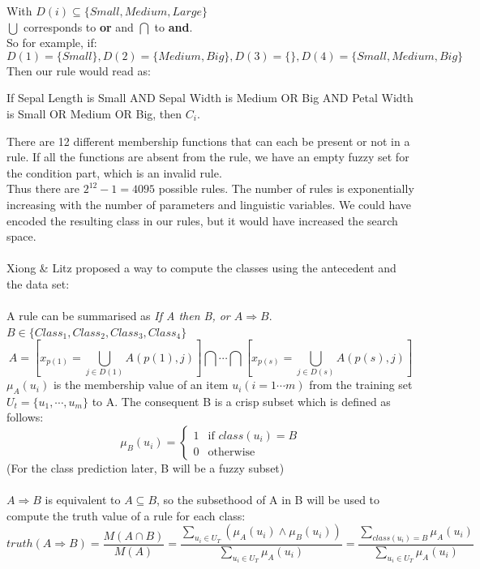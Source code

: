\documentclass[a4paper,12pt]{article}
\begin{document}
With $D(i)\subseteq\{Small,Medium,Large\}$ \\
$\bigcup$ corresponds to \textbf{or} and $\bigcap$ to \textbf{and}.\\
So for example, if:
\[D(1)=\{Small\},D(2)=\{Medium,Big\},D(3)=\{\},D(4)=\{Small,Medium,Big\}\]
Then our rule would read as:
\begin{center}If Sepal Length is Small AND Sepal Width is Medium OR Big AND Petal Width is Small OR Medium OR Big, then $C_i$.\end{center} 
There are 12 different membership functions that can each be present or not in a rule. If all the functions are absent from the rule, we have an empty fuzzy set for the condition part, which is an invalid rule.\\
Thus there are $2^{12}-1=4095$ possible rules. The number of rules is exponentially increasing with the number of parameters and linguistic variables. We could have encoded the resulting class in our rules, but it would have increased the search space. \\ 
\\
Xiong \& Litz proposed a way to compute the classes using the antecedent and the data set: \\
\\
A rule can be summarised as \textit{If A then B, or $A\Rightarrow B$}.\\
$B\in \{Class_1,Class_2,Class_3,Class_4\}$\\
\[A=[x_{p(1)}=\bigcup_{j\in D(1)}A(p(1),j) ] \bigcap\cdots\bigcap[x_{p(s)}=\bigcup_{j\in D(s)}A(p(s),j)]\]
$\mu_A(u_i)$ is the membership value of an item $u_i(i=1\cdots m)$ from the training set $U_t=\{u_1,\cdots ,u_m\}$ to A.
The consequent B is a crisp subset which is defined as follows:
\[\mu_B(u_i)=
\begin{cases}
	1 & \text{if $class(u_i)=B$}\\
	0 & \text{otherwise}
\end{cases}\]
(For the class prediction later, B will be a fuzzy subset)\\
\\
$A\Rightarrow B$ is equivalent to $A\subseteq B$, so the subsethood of A in B will be used to compute the truth value of a rule for each class:
\[
	truth(A\Rightarrow B)=
	\frac{M(A\cap B)}{M(A)}=
	\frac
		{\sum\limits_{u_i\in U_T}{(\mu_A(u_i)\land \mu_B(u_i))}}
		{\sum\limits_{u_i\in U_T}{\mu_A(u_i)}}=
	\frac
		{\sum\limits_{class(u_i)=B}{\mu_A(u_i)}}
		{\sum\limits_{u_i\in U_T}{\mu_A(u_i)}}
\]
\end{document}

